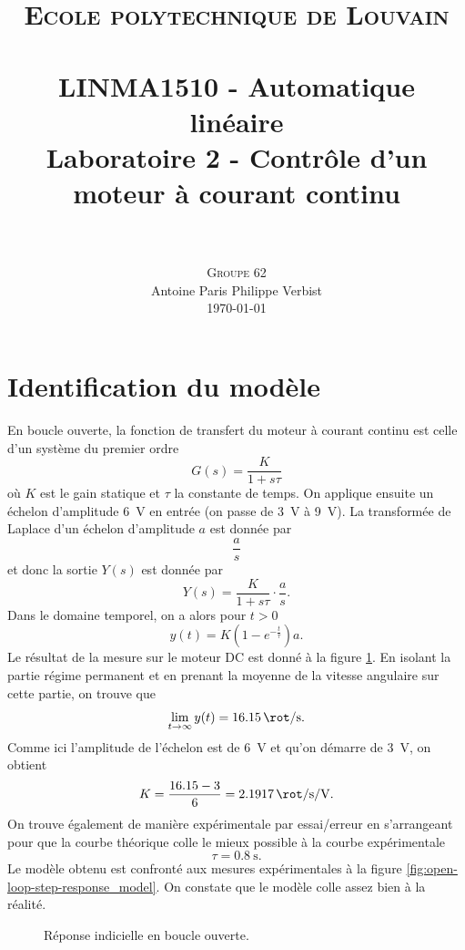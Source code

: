 \documentclass[frenchb, paper=a4, fontsize=11pt]{scrartcl}
\title{
		\usefont{OT1}{bch}{b}{n}
		\normalfont \normalsize \textsc{Ecole polytechnique de Louvain} \\ [25pt]
		\horrule{0.5pt} \\[0.4cm]
		\large LINMA1510 - Automatique linéaire\\
		\huge Laboratoire 2 - Contrôle d'un moteur à courant continu \\
		\horrule{1.5pt} \\[0.5cm]
}
\author{
		\normalfont
		\textsc{Groupe 62}\\
      	Antoine Paris\hspace{0.6cm} Philippe Verbist \\	
       	\normalsize
        \today
}
\date{}
\numberwithin{equation}{section}					%
\numberwithin{figure}{section}					%
\numberwithin{table}{section}						%
\begin{document}
\maketitle

\section{Identification du modèle}
En boucle ouverte, la fonction de transfert du moteur à courant
continu est celle d'un système du premier ordre
\begin{equation}
	G(s) = \frac{K}{1+s\tau}
\end{equation}
où $K$ est le gain statique et $\tau$ la constante de temps.
On applique ensuite un échelon d'amplitude \SI{6}{\volt} en
entrée (on passe de \SI{3}{\volt} à \SI{9}{\volt}). La
transformée de Laplace d'un échelon d'amplitude $a$ est donnée
par
\begin{equation}
	\frac{a}{s}
\end{equation}
et donc la sortie $Y(s)$ est donnée par
\begin{equation}
	Y(s) = \frac{K}{1+s\tau}\cdot\frac{a}{s}.
\end{equation}
Dans le domaine temporel, on a alors pour $t > 0$
\begin{equation}
	y(t) = K(1-e^{-\frac{t}{\tau}})a.
\end{equation}
Le résultat de la mesure sur le moteur DC est donné à la figure
\ref{fig:open-loop-step-response}. En isolant la partie régime
permanent et en prenant la moyenne de la vitesse angulaire sur
cette partie, on trouve que
\begin{equation}
	\lim_{t\to\infty} y(t) = \SI{16.15}{\rot\per\second}.
\end{equation}
Comme ici l'amplitude de l'échelon est de \SI{6}{\volt} et qu'on
démarre de \SI{3}{\volt}, on obtient
\begin{equation}
	K = \frac{16.15-3}{6} = \SI{2.1917}{\rot\per\second\per\volt}.
\end{equation}
On trouve également de manière expérimentale par essai/erreur en
s'arrangeant pour que la courbe théorique colle le mieux possible
à la courbe expérimentale
\begin{equation}
	\tau = \SI{0.8}{\second}.
\end{equation}
Le modèle obtenu est confronté aux mesures expérimentales à la
figure \ref{fig:open-loop-step-response_model}. On constate que
le modèle colle assez bien à la réalité.

\begin{figure}[ht]
	\centering
	
	\caption{Réponse indicielle en boucle ouverte.}
	\label{fig:open-loop-step-response}
\end{figure}
\end{document}
